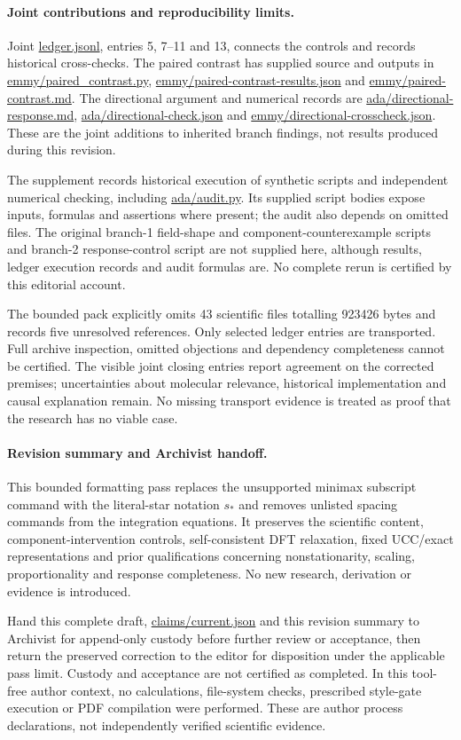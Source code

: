 \documentclass{article}
\begin{document}
\paragraph{Joint contributions and reproducibility limits.}
Joint \url{ledger.jsonl}, entries 5, 7--11 and 13, connects the controls and records historical cross-checks. The paired contrast has supplied source and outputs in \url{emmy/paired_contrast.py}, \url{emmy/paired-contrast-results.json} and \url{emmy/paired-contrast.md}. The directional argument and numerical records are \url{ada/directional-response.md}, \url{ada/directional-check.json} and \url{emmy/directional-crosscheck.json}. These are the joint additions to inherited branch findings, not results produced during this revision.

The supplement records historical execution of synthetic scripts and independent numerical checking, including \url{ada/audit.py}. Its supplied script bodies expose inputs, formulas and assertions where present; the audit also depends on omitted files. The original branch-1 field-shape and component-counterexample scripts and branch-2 response-control script are not supplied here, although results, ledger execution records and audit formulas are. No complete rerun is certified by this editorial account.

The bounded pack explicitly omits 43 scientific files totalling 923426 bytes and records five unresolved references. Only selected ledger entries are transported. Full archive inspection, omitted objections and dependency completeness cannot be certified. The visible joint closing entries report agreement on the corrected premises; uncertainties about molecular relevance, historical implementation and causal explanation remain. No missing transport evidence is treated as proof that the research has no viable case.

\paragraph{Revision summary and Archivist handoff.}
This bounded formatting pass replaces the unsupported minimax subscript command with the literal-star notation $s_*$ and removes unlisted spacing commands from the integration equations. It preserves the scientific content, component-intervention controls, self-consistent DFT relaxation, fixed UCC/exact representations and prior qualifications concerning nonstationarity, scaling, proportionality and response completeness. No new research, derivation or evidence is introduced.

Hand this complete draft, \url{claims/current.json} and this revision summary to Archivist for append-only custody before further review or acceptance, then return the preserved correction to the editor for disposition under the applicable pass limit. Custody and acceptance are not certified as completed. In this tool-free author context, no calculations, file-system checks, prescribed style-gate execution or PDF compilation were performed. These are author process declarations, not independently verified scientific evidence.
\end{document}
